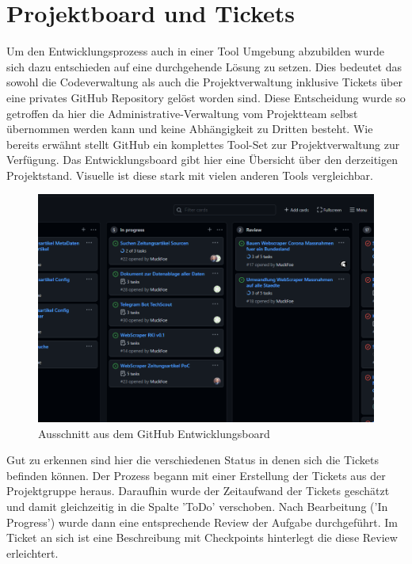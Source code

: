 \documentclass[12pt,oneside,a4paper,parskip]{scrbook}
\begin{document}
\section{Projektboard und Tickets}
Um den Entwicklungsprozess auch in einer Tool Umgebung abzubilden wurde sich dazu entschieden auf eine durchgehende L\"osung zu setzen. Dies bedeutet das sowohl die Codeverwaltung als auch die Projektverwaltung inklusive Tickets \"uber eine privates GitHub Repository gel\"ost worden sind. Diese Entscheidung wurde so getroffen da hier die Administrative-Verwaltung vom Projektteam selbst \"ubernommen werden kann und keine Abh\"angigkeit zu Dritten besteht. \newline
Wie bereits erw\"ahnt stellt GitHub ein komplettes Tool-Set zur Projektverwaltung zur Verf\"ugung. Das Entwicklungsboard gibt hier eine \"Ubersicht
\"uber den derzeitigen Projektstand. Visuelle ist diese stark mit vielen anderen Tools vergleichbar.
\begin{figure}[H]
	\caption{Ausschnitt aus dem GitHub Entwicklungsboard}
	\label{gitHubBoasrd}
	\centering
	\includegraphics[scale=0.35]{pictures/gitHubBoard.png}
\end{figure}
Gut zu erkennen sind hier die verschiedenen Status in denen sich die Tickets befinden k\"onnen. \newline
Der Prozess begann mit einer Erstellung der Tickets aus der Projektgruppe heraus. Daraufhin wurde der Zeitaufwand der Tickets gesch\"atzt und damit gleichzeitig in die Spalte 'ToDo' verschoben. Nach Bearbeitung ('In Progress') wurde dann eine entsprechende Review der Aufgabe durchgef\"uhrt. Im Ticket an sich ist eine Beschreibung mit Checkpoints hinterlegt die diese Review erleichtert.
\end{document}
